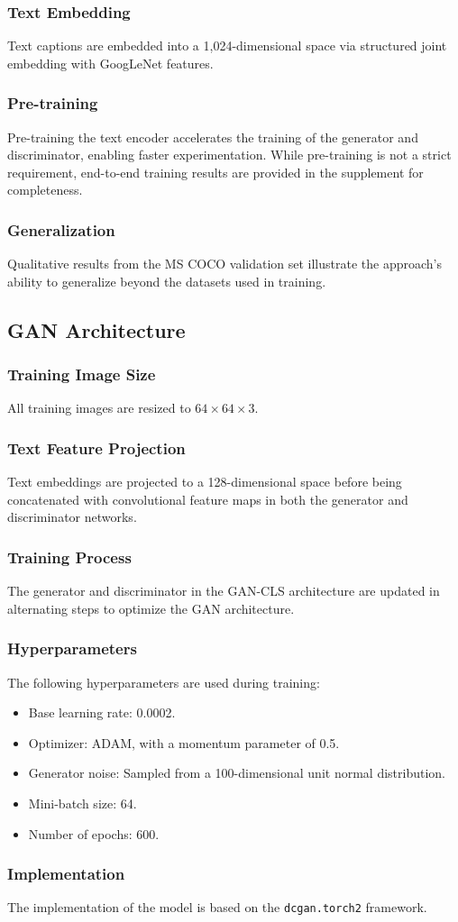 \subsubsection*{Text Embedding}
Text captions are embedded into a 1,024-dimensional space via structured joint embedding with GoogLeNet features. 

\subsubsection*{Pre-training}
Pre-training the text encoder accelerates the training of the generator and discriminator, enabling faster experimentation. While pre-training is not a strict requirement, end-to-end training results are provided in the supplement for completeness.

\subsubsection*{Generalization}
Qualitative results from the MS COCO validation set illustrate the approach's ability to generalize beyond the datasets used in training.

\subsection*{GAN Architecture}

\subsubsection*{Training Image Size}
All training images are resized to \(64 \times 64 \times 3\).

\subsubsection*{Text Feature Projection}
Text embeddings are projected to a 128-dimensional space before being concatenated with convolutional feature maps in both the generator and discriminator networks.

\subsubsection*{Training Process}
The generator and discriminator in the GAN-CLS architecture are updated 
in alternating steps to optimize the GAN architecture.

\subsubsection*{Hyperparameters}
The following hyperparameters are used during training:
\begin{itemize}
    \item Base learning rate: 0.0002.
    \item Optimizer: ADAM, with a momentum parameter of 0.5.
    \item Generator noise: Sampled from a 100-dimensional unit normal distribution.
    \item Mini-batch size: 64.
    \item Number of epochs: 600.
\end{itemize}

\subsubsection*{Implementation}
The implementation of the model is based on the \texttt{dcgan.torch2} 
framework.
